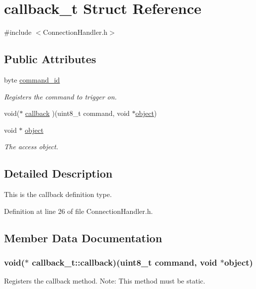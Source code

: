 \hypertarget{structcallback__t}{\section{callback\-\_\-t \-Struct \-Reference}
\label{structcallback__t}
}


{\ttfamily \#include $<$\-Connection\-Handler.\-h$>$}

\subsection*{\-Public \-Attributes}
\begin{DoxyCompactItemize}
\item 
byte \hyperlink{structcallback__t_ada2c0e2a936e49f0ece582c40953c278}{command\-\_\-id}
\begin{DoxyCompactList}\small\item\em \-Registers the command to trigger on. \end{DoxyCompactList}\item 
void($\ast$ \hyperlink{structcallback__t_a9d48eeac6fd6f90eb5d053b30074cc7b}{callback} )(uint8\-\_\-t command, void $\ast$\hyperlink{structcallback__t_a30ed93032c0a2ead09070156d7c37790}{object})
\item 
void $\ast$ \hyperlink{structcallback__t_a30ed93032c0a2ead09070156d7c37790}{object}
\begin{DoxyCompactList}\small\item\em \-The access object. \end{DoxyCompactList}\end{DoxyCompactItemize}


\subsection{\-Detailed \-Description}
\-This is the callback definition type. 

\-Definition at line 26 of file \-Connection\-Handler.\-h.



\subsection{\-Member \-Data \-Documentation}
\hypertarget{structcallback__t_a9d48eeac6fd6f90eb5d053b30074cc7b}{
\subsubsection[{callback}]{\setlength{\rightskip}{0pt plus 5cm}void($\ast$ {\bf callback\-\_\-t\-::callback})(uint8\-\_\-t command, void $\ast${\bf object})}}\label{structcallback__t_a9d48eeac6fd6f90eb5d053b30074cc7b}
\-Registers the callback method. \-Note\-: \-This method must be static. 

